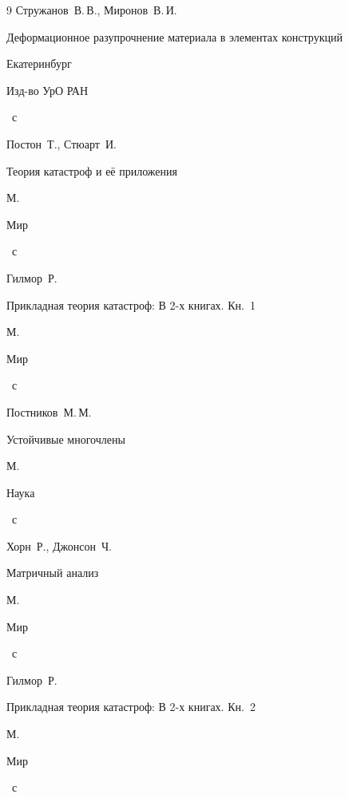 \begin{thebibliography}{9}
\by Стружанов~В.\,В., Миронов~В.\,И.

\book Деформационное разупрочнение материала в элементах конструкций

\publaddr Екатеринбург

\publ Изд-во УрО РАН


~с




\by Постон~Т., Стюарт~И.

\book Теория катастроф и её приложения

\publaddr  М.

\publ Мир


~с




\by Гилмор~Р.

\book Прикладная теория катастроф: В 2-х книгах. Кн.~1

\publaddr М.

\publ Мир


~с




\by Постников~М.\,М.

\book Устойчивые многочлены

\publaddr М.

\publ Наука


~с




\by Хорн~Р., Джонсон~Ч.

\book Матричный анализ

\publaddr М.

\publ Мир


~с








\by Гилмор~Р.

\book Прикладная теория катастроф: В 2-х книгах.  Кн.~2

\publaddr М.

\publ Мир


~с



\end{thebibliography}





